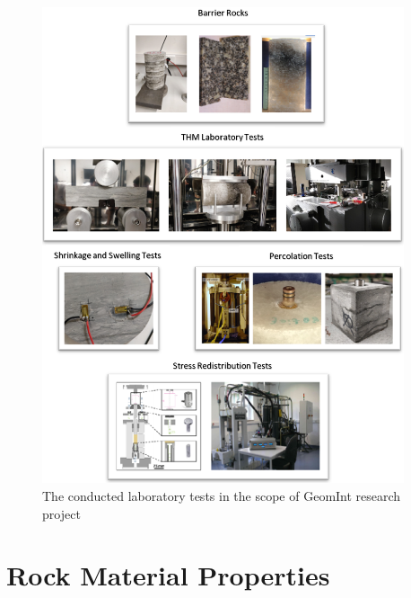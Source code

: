 \begin{figure}[!ht]
\centering
\includegraphics[width=0.95\textwidth]{figures/Amir_Experiment.png}
\caption{The conducted laboratory tests in the scope of GeomInt research project}
\label{fig:Amir_Experiment}
\end{figure} 
\section{Rock Material Properties}
\label{sec:material-properties}

\clearpage

\clearpage

\clearpage
